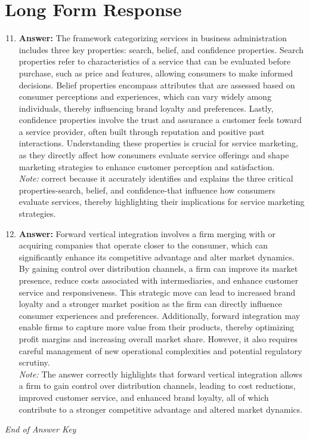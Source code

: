 \documentclass[12pt]{article}
\begin{document}
\section*{Long Form Response}
\begin{enumerate}[label=\arabic*.]
\setcounter{enumi}{10}
\item \textbf{Answer:} The framework categorizing services in business administration includes three key properties: search, belief, and confidence properties. Search properties refer to characteristics of a service that can be evaluated before purchase, such as price and features, allowing consumers to make informed decisions. Belief properties encompass attributes that are assessed based on consumer perceptions and experiences, which can vary widely among individuals, thereby influencing brand loyalty and preferences. Lastly, confidence properties involve the trust and assurance a customer feels toward a service provider, often built through reputation and positive past interactions. Understanding these properties is crucial for service marketing, as they directly affect how consumers evaluate service offerings and shape marketing strategies to enhance customer perception and satisfaction.
\\ \textit{Note:} correct because it accurately identifies and explains the three critical properties-search, belief, and confidence-that influence how consumers evaluate services, thereby highlighting their implications for service marketing strategies.
\item \textbf{Answer:} Forward vertical integration involves a firm merging with or acquiring companies that operate closer to the consumer, which can significantly enhance its competitive advantage and alter market dynamics. By gaining control over distribution channels, a firm can improve its market presence, reduce costs associated with intermediaries, and enhance customer service and responsiveness. This strategic move can lead to increased brand loyalty and a stronger market position as the firm can directly influence consumer experiences and preferences. Additionally, forward integration may enable firms to capture more value from their products, thereby optimizing profit margins and increasing overall market share. However, it also requires careful management of new operational complexities and potential regulatory scrutiny.
\\ \textit{Note:} The answer correctly highlights that forward vertical integration allows a firm to gain control over distribution channels, leading to cost reductions, improved customer service, and enhanced brand loyalty, all of which contribute to a stronger competitive advantage and altered market dynamics.
\end{enumerate}

\vfill
\noindent\textit{End of Answer Key}
\end{document}
